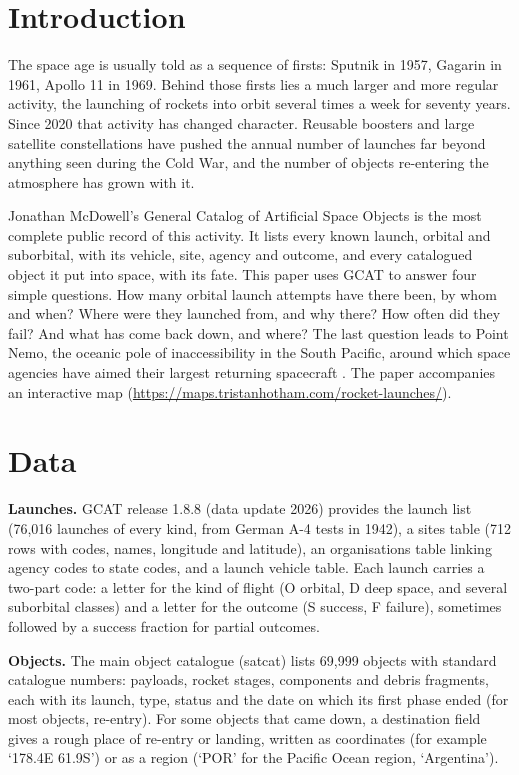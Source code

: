 \documentclass[11pt,a4paper]{article}
\begin{document}
\section{Introduction}
The space age is usually told as a sequence of firsts: Sputnik in 1957, Gagarin in 1961, Apollo 11 in 1969. Behind those firsts lies a much larger and more regular activity, the launching of rockets into orbit several times a week for seventy years. Since 2020 that activity has changed character. Reusable boosters and large satellite constellations have pushed the annual number of launches far beyond anything seen during the Cold War, and the number of objects re-entering the atmosphere has grown with it.

Jonathan McDowell's General Catalog of Artificial Space Objects \citep{gcat} is the most complete public record of this activity. It lists every known launch, orbital and suborbital, with its vehicle, site, agency and outcome, and every catalogued object it put into space, with its fate. This paper uses GCAT to answer four simple questions. How many orbital launch attempts have there been, by whom and when? Where were they launched from, and why there? How often did they fail? And what has come back down, and where? The last question leads to Point Nemo, the oceanic pole of inaccessibility in the South Pacific, around which space agencies have aimed their largest returning spacecraft \citep{wikinemo,wikicem}. The paper accompanies an interactive map (\url{https://maps.tristanhotham.com/rocket-launches/}).

\section{Data}
\textbf{Launches.} GCAT release 1.8.8 (data update 2026) provides the launch list (76,016 launches of every kind, from German A-4 tests in 1942), a sites table (712 rows with codes, names, longitude and latitude), an organisations table linking agency codes to state codes, and a launch vehicle table. Each launch carries a two-part code: a letter for the kind of flight (O orbital, D deep space, and several suborbital classes) and a letter for the outcome (S success, F failure), sometimes followed by a success fraction for partial outcomes.

\textbf{Objects.} The main object catalogue (satcat) lists 69,999 objects with standard catalogue numbers: payloads, rocket stages, components and debris fragments, each with its launch, type, status and the date on which its first phase ended (for most objects, re-entry). For some objects that came down, a destination field gives a rough place of re-entry or landing, written as coordinates (for example `178.4E 61.9S') or as a region (`POR' for the Pacific Ocean region, `Argentina').
\end{document}
